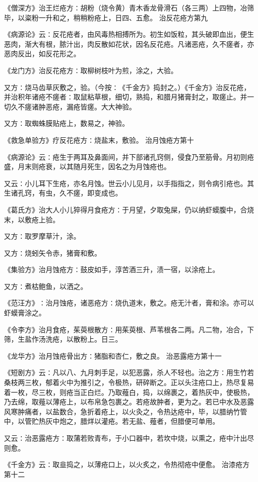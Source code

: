 \documentclass[a4paper,12pt,UTF8,twoside]{ctexbook}
\begin{document}
《僧深方》治王烂疮方∶胡粉（烧令黄）青木香龙骨滑石（各三两）上四物，冶筛毕，以粢粉一升和之，稍稍粉疮上，日四、五愈。
治反花疮方第九

《病源论》云∶反花疮者，由风毒热相搏所为。初生如饭粒，其头破即血出，便生恶肉，渐大有根，脓汁出，肉反散如花状，因名反花疮。凡诸恶疮，久不瘥者，亦恶肉反出，如反花形之。

《龙门方》治反花疮方∶取柳树枝叶为煎，涂之，大验。

又方∶烧马齿草灰敷之，验。（今按∶《千金方》捣封之。）《千金方》治反花疮，并治积年诸疮不瘥者∶取鼠粘草根，细切，熟捣，和腊月猪膏封之，取瘥止。并一切久不瘥诸肿恶疮，漏疮皆瘥。大大神验。

又方∶取蜘蛛膜贴疮上，数易之，神验。

《救急单验方》疗反花疮方∶烧盐末，敷验。
治月蚀疮方第十

《病源论》云∶疮生于两耳及鼻面间，并下部诸孔窍侧，侵食乃至筋骨。月初则疮盛，月末则疮衰，以其随月死生，因名之为月蚀疮也。

又云∶小儿耳下生疮，亦名月蚀。世云小儿见月，以手指指之，则令病引疮也。其生诸孔窍，有虫，久不瘥，即变成也。

《葛氏方》治大人小儿猝得月食疮方∶于月望，夕取兔屎，仍以纳虾蟆腹中，合烧末，以敷疮上验。

又方∶取罗摩草汁，涂。

又方∶烧蚓矢令赤，猪膏和敷。

《集验方》治月蚀疮方∶鼓皮如手，淳苦酒三升，渍一宿，以涂疮上。

又方∶煮枯鲍鱼，以洒之。

《范汪方》∶治月蚀疮，诸恶疮方∶烧仇道末，敷之。疮无汁者，膏和涂。亦可以虾蟆膏涂之。

《令李方》治月食疮，茱萸根散方∶用茱萸根、芦苇根各二两。凡二物，冶合，下筛，生盐作汤洗疮，以散粉上。日三。

《龙华方》治月蚀疮骨出方∶猪脂和杏仁，敷之良。
治恶露疮方第十一

《短剧方》云∶凡以八、九月刺手足，以犯恶露，杀人不轻也。治之方∶用生竹若桑枝两三枚，郁着火中为推引之，令极热，研碎断之。正以头注疮口上，热尽复易着一枚，尽三枚，则疮当正白烂。乃取薤白，捣，以绵裹之，着热灰中，使极热，乃去绵，取薤以薄疮上，以布帛急包裹之。若疮故肿者，更为之。若已中水及恶露风寒肿痛者，以盐数合，急折着疮上，以火灸之，令热达疮中，毕，以腊纳竹管中，以管贮热灰中炮之，腊烊以灌疮。若无盐、薤者，但腊便可单用。

又云∶治恶露疮方∶取蒲若败青布，于小口器中，若坎中烧，以熏之，疮中汁出尽则愈。

《千金方》云∶取韭捣之，以薄疮口上，以火炙之，令热彻疮中便愈。
治漆疮方第十二
\end{document}

